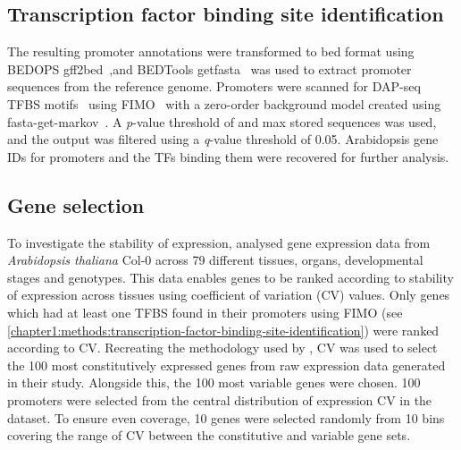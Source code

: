 \documentclass[../Sam_Witham_Thesis.tex]{subfiles}
\begin{document}
\subsection{Transcription factor binding site identification}
\label{chapter1:methods:transcription-factor-binding-site-identification}

The resulting promoter annotations were transformed to bed format using BEDOPS gff2bed~\autocite{nephBEDOPSHighperformanceGenomic2012},and BEDTools getfasta~\autocite{quinlanBEDToolsFlexibleSuite2010} was used to extract promoter sequences from the reference genome.
Promoters were scanned for DAP\hyp{}seq TFBS motifs~\autocite{omalleyCistromeEpicistromeFeatures2016} using FIMO~\autocite{grantFIMOScanningOccurrences2011} with a zero\hyp{}order background model created using fasta\hyp{}get\hyp{}markov~\autocite{baileyMEMESuiteTools2009}.
A \textit{p}\hyp{}value threshold of  and max stored sequences  was used, and the output was filtered using a \textit{q}\hyp{}value threshold of 0.05.
Arabidopsis gene IDs for promoters and the TFs binding them were recovered for further analysis.

\subsection{Gene selection}\label{chapter1:methods:gene-selection}

To investigate the stability of expression, \textcite*{czechowskiGenomeWideIdentificationTesting2005} analysed gene expression data from \textit{Arabidopsis thaliana} Col-0 across 79 different tissues, organs, developmental stages and genotypes.
This data enables genes to be ranked according to stability of expression across tissues using coefficient of variation (CV) values.
Only genes which had at least one TFBS found in their promoters using FIMO (see \autoref{chapter1:methods:transcription-factor-binding-site-identification}) were ranked according to CV.
Recreating the methodology used by \textcite*{czechowskiGenomeWideIdentificationTesting2005}, CV was used to select the 100 most constitutively expressed genes from raw expression data generated in their study.
Alongside this, the 100 most variable genes were chosen.
100 promoters were selected from the central distribution of expression CV in the \textcite*{czechowskiGenomeWideIdentificationTesting2005} dataset.
To ensure even coverage, 10 genes were selected randomly from 10 bins covering the range of CV between the constitutive and variable gene sets.
\end{document}
